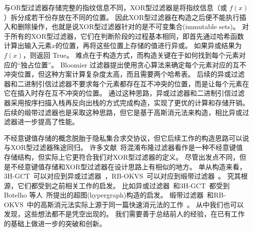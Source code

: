 
与OR型过滤器存储完整的指纹信息不同，XOR型过滤器是将指纹信息（或 $f(x)$）拆分成若干份存放在不同的位置。
因此XOR型过滤器在构造之后便不能执行插入和删除操作，也就是说XOR型过滤器针对的是不可变集合(immutable sets)。
对于所有的XOR型过滤器，它们在判断阶段的过程基本相同，即首先通过哈希函数计算出输入元素$x$的位置，再将这些位置上存储的值进行异或。
如果异或结果为 $f(x)$，则返回 True。
难点在于构造方式，而构造关键在于如何找到每个元素对应的``独占位置''。
Bloomier 过滤器提出使用贪心算法来确定每个元素对应的互不冲突位置，但这种方案计算复杂度太高，而且需要两个哈希表。
后续的异或过滤器和二进制引信过滤器不要求每个元素都存在互不冲突的位置，而是让每个元素在它在插入时存在互不冲突的位置。
通过这种思路，异或过滤器和二进制引信过滤器采用按序扫描入栈再反向出栈的方式完成构造，实现了更优的计算和存储开销。
后续的缎带过滤器也是采取这种思路，但它是基于高斯消元法来构造，相比异或过滤器进一步提高了性能。

不经意键值存储的概念脱胎于隐私集合求交协议，但它后续工作的构造思路可以说与XOR型过滤器殊途同归。
许多文献~\cite{garimella2021oblivious,raghuraman2022blazing,bienstock2023NearOptimal}将混淆布隆过滤器看作是一种不经意键值存储结构，但实际上它更符合我们对XOR型过滤器的定义。
尽管出发点不同，但是不经意键值存储和XOR型过滤器在设计思路上有相似的地方。
单从构造来看，3H-GCT~\cite{garimella2021oblivious}可以对应到异或过滤器~\cite{graf2020xor}，RB-OKVS~\cite{bienstock2023NearOptimal}可以对应到缎带过滤器~\cite{dillinger2021ribbon}。
究其根源，它们都受到之前相关工作的启发。
比如异或过滤器~\cite{graf2020xor}和3H-GCT~\cite{garimella2021oblivious}都受到 Botelho 等人~\cite{botelho2007simple,botelho2013Practical}所提出的超图(hypergraph)构造的启发。
缎带过滤器~\cite{dillinger2021ribbon}和RB-OKVS~\cite{bienstock2023NearOptimal}中的高斯消元法实际上源于同一篇快速消元法的工作~\cite{dietzfelbinger2019Efficient}。
从中我们也可以发现，这些想法都不是凭空出现的。
我们需要善于总结前人的经验，在已有工作的基础上做进一步的突破和创新。
